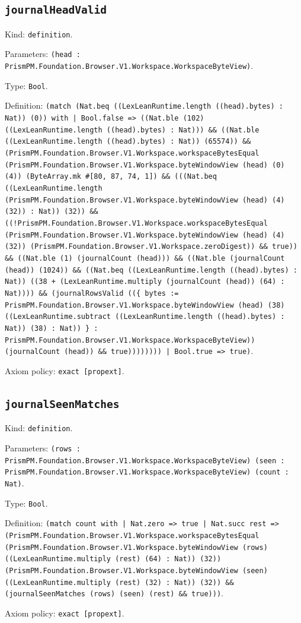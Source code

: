 \documentclass[11pt]{article}
\begin{document}
\subsection*{\texttt{journalHeadValid}}
\noindent Kind: \texttt{definition}.\par
\noindent Parameters: \texttt{(head : PrismPM.Foundation.Browser.V1.Workspace.WorkspaceByteView)}.\par
\noindent Type: \texttt{Bool}.\par
\noindent Definition: \texttt{(match (Nat.beq ((LexLeanRuntime.length ((head).bytes) : Nat)) (0)) with | Bool.false => ((Nat.ble (102) ((LexLeanRuntime.length ((head).bytes) : Nat))) \&\& ((Nat.ble ((LexLeanRuntime.length ((head).bytes) : Nat)) (65574)) \&\& (PrismPM.Foundation.Browser.V1.Workspace.workspaceBytesEqual (PrismPM.Foundation.Browser.V1.Workspace.byteWindowView (head) (0) (4)) (ByteArray.mk \#[80, 87, 74, 1]) \&\& (((Nat.beq ((LexLeanRuntime.length (PrismPM.Foundation.Browser.V1.Workspace.byteWindowView (head) (4) (32)) : Nat)) (32)) \&\& ((!PrismPM.Foundation.Browser.V1.Workspace.workspaceBytesEqual (PrismPM.Foundation.Browser.V1.Workspace.byteWindowView (head) (4) (32)) (PrismPM.Foundation.Browser.V1.Workspace.zeroDigest)) \&\& true)) \&\& ((Nat.ble (1) (journalCount (head))) \&\& ((Nat.ble (journalCount (head)) (1024)) \&\& ((Nat.beq ((LexLeanRuntime.length ((head).bytes) : Nat)) ((38 + (LexLeanRuntime.multiply (journalCount (head)) (64) : Nat)))) \&\& (journalRowsValid ((\{ bytes := PrismPM.Foundation.Browser.V1.Workspace.byteWindowView (head) (38) ((LexLeanRuntime.subtract ((LexLeanRuntime.length ((head).bytes) : Nat)) (38) : Nat)) \} : PrismPM.Foundation.Browser.V1.Workspace.WorkspaceByteView)) (journalCount (head)) \&\& true)))))))) | Bool.true => true)}.\par
\noindent Axiom policy: \texttt{exact [propext]}.\par
\subsection*{\texttt{journalSeenMatches}}
\noindent Kind: \texttt{definition}.\par
\noindent Parameters: \texttt{(rows : PrismPM.Foundation.Browser.V1.Workspace.WorkspaceByteView) (seen : PrismPM.Foundation.Browser.V1.Workspace.WorkspaceByteView) (count : Nat)}.\par
\noindent Type: \texttt{Bool}.\par
\noindent Definition: \texttt{(match count with | Nat.zero => true | Nat.succ rest => (PrismPM.Foundation.Browser.V1.Workspace.workspaceBytesEqual (PrismPM.Foundation.Browser.V1.Workspace.byteWindowView (rows) ((LexLeanRuntime.multiply (rest) (64) : Nat)) (32)) (PrismPM.Foundation.Browser.V1.Workspace.byteWindowView (seen) ((LexLeanRuntime.multiply (rest) (32) : Nat)) (32)) \&\& (journalSeenMatches (rows) (seen) (rest) \&\& true)))}.\par
\noindent Axiom policy: \texttt{exact [propext]}.\par
\end{document}
